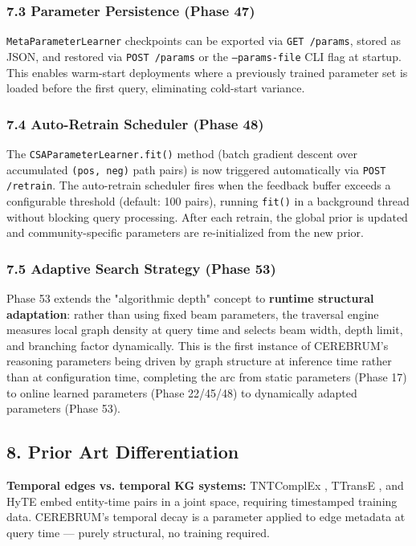 \subsubsection*{7.3 Parameter Persistence (Phase 47)}
\texttt{MetaParameterLearner} checkpoints can be exported via \texttt{GET /params}, stored as JSON, and restored via \texttt{POST /params} or the \texttt{--params-file} CLI flag at startup. This enables warm-start deployments where a previously trained parameter set is loaded before the first query, eliminating cold-start variance.

\subsubsection*{7.4 Auto-Retrain Scheduler (Phase 48)}
The \texttt{CSAParameterLearner.fit()} method (batch gradient descent over accumulated \texttt{(pos, neg)} path pairs) is now triggered automatically via \texttt{POST /retrain}. The auto-retrain scheduler fires when the feedback buffer exceeds a configurable threshold (default: 100 pairs), running \texttt{fit()} in a background thread without blocking query processing. After each retrain, the global prior is updated and community-specific parameters are re-initialized from the new prior.

\subsubsection*{7.5 Adaptive Search Strategy (Phase 53)}
Phase 53 extends the "algorithmic depth" concept to \textbf{runtime structural adaptation}: rather than using fixed beam parameters, the traversal engine measures local graph density at query time and selects beam width, depth limit, and branching factor dynamically. This is the first instance of CEREBRUM's reasoning parameters being driven by graph structure at inference time rather than at configuration time, completing the arc from static parameters (Phase 17) to online learned parameters (Phase 22/45/48) to dynamically adapted parameters (Phase 53).

\subsection*{8. Prior Art Differentiation}

\textbf{Temporal edges vs. temporal KG systems:} TNTComplEx \cite{lacroix2020tntcomplex}, TTransE \cite{lin2015ttranse}, and HyTE \cite{sun2017hyte} embed entity-time pairs in a joint space, requiring timestamped training data. CEREBRUM's temporal decay is a parameter applied to edge metadata at query time --- purely structural, no training required.


